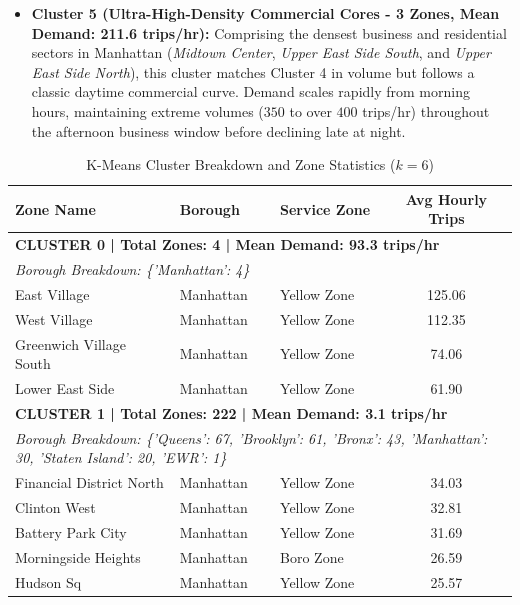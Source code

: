 \documentclass[11pt,a4paper]{article}
\begin{document}
\begin{itemize}
    \item \textbf{Cluster 5 (Ultra-High-Density Commercial Cores - 3 Zones, Mean Demand: 211.6 trips/hr):} 
    Comprising the densest business and residential sectors in Manhattan (\textit{Midtown Center}, \textit{Upper East Side South}, and \textit{Upper East Side North}), this cluster matches Cluster 4 in volume but follows a classic daytime commercial curve. Demand scales rapidly from morning hours, maintaining extreme volumes ($350$ to over $400$ trips/hr) throughout the afternoon business window before declining late at night.
\end{itemize}

\begin{table}[htbp]
    \centering
    \tiny
    \caption{K-Means Cluster Breakdown and Zone Statistics ($k = 6$)}
    \label{tab:kmeans_exact_clusters}
    \begin{tabular}{lllc}
        \toprule
        \textbf{Zone Name} & \textbf{Borough} & \textbf{Service Zone} & \textbf{Avg Hourly Trips} \\
        \midrule
        \multicolumn{4}{l}{\textbf{CLUSTER 0 | Total Zones: 4 | Mean Demand: 93.3 trips/hr}} \\
        \multicolumn{4}{l}{\textit{Borough Breakdown: \{'Manhattan': 4\}}} \\
        \midrule
        East Village & Manhattan & Yellow Zone & 125.06 \\
        West Village & Manhattan & Yellow Zone & 112.35 \\
        Greenwich Village South & Manhattan & Yellow Zone & 74.06 \\
        Lower East Side & Manhattan & Yellow Zone & 61.90 \\
        \midrule
        \multicolumn{4}{l}{\textbf{CLUSTER 1 | Total Zones: 222 | Mean Demand: 3.1 trips/hr}} \\
        \multicolumn{4}{l}{\textit{Borough Breakdown: \{'Queens': 67, 'Brooklyn': 61, 'Bronx': 43, 'Manhattan': 30, 'Staten Island': 20, 'EWR': 1\}}} \\
        \midrule
        Financial District North & Manhattan & Yellow Zone & 34.03 \\
        Clinton West & Manhattan & Yellow Zone & 32.81 \\
        Battery Park City & Manhattan & Yellow Zone & 31.69 \\
        Morningside Heights & Manhattan & Boro Zone & 26.59 \\
        Hudson Sq & Manhattan & Yellow Zone & 25.57 \\

\end{tabular}
\end{table}
\end{document}
